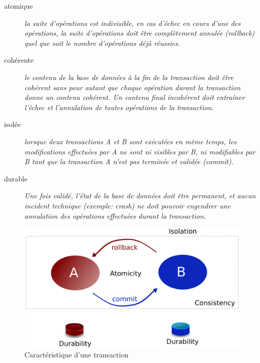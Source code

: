 {  \begin{description}
    \item[atomique] \textit{la suite d'opérations est indivisible, en cas d'échec en cours d'une des
    opérations, la suite d'opérations doit être complètement annulée (rollback) quel que soit le
    nombre d'opérations déjà réussies.}
    \item[cohérente] \textit{le contenu de la base de données à la fin de la transaction doit être
    cohérent sans pour autant que chaque opération durant la transaction donne un contenu cohérent.
    Un contenu final incohérent doit entraîner l'échec et l'annulation de toutes opérations de la
    transaction.}
    \item[isolée] \textit{lorsque deux transactions A et B sont exécutées en même temps, les
    modifications effectuées par A ne sont ni visibles par B, ni modifiables par B tant que la
    transaction A n'est pas terminée et validée (commit).}
    \item[durable] \textit{Une fois validé, l'état de la base de données doit être permanent, et
    aucun incident technique (exemple: crash) ne doit pouvoir engendrer une annulation des
    opérations effectuées durant la transaction.}
  \end{description}

  \begin{figure}[hb]
    \begin{center}
      \includegraphics[scale=0.25]{img/transaction.png}
      \caption{Caractéristique d'une transaction}
      \label{tx}
    \end{center}
  \end{figure}
}

